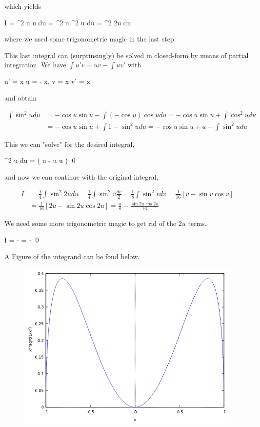 which yields

\bee
I = \int \sin^2 u  \cos u du = \int \sin^2 u \cos^2 u du =  \int \sin^2 2u du
\eee

where we used some trigonometric magic in the last step.

This last integral can (surprinsingly) be solved in closed-form by means of partial integration. We have $\int u' v = uv - \int u v'$ with

\bee
u' = \sin x \rightarrow u = - \cos x, v = \sin x \rightarrow v' = \cos x
\eee

and obtain

\begin{align*}
\int \sin^2 u du &= - \cos u \sin u - \int (- \cos u) \cos u du = - \cos u \sin u + \int \cos^2 u du \\ &= - \cos u \sin u + \int 1 - \sin^2 u du = - \cos u \sin u + u - \int \sin^2 u du
\end{align*}

This we can "solve" for the desired integral,

\bee
\int \sin^2 u du =  \left( u - \sin u \cos u \right) \qed
\eee

and now we can continue with the original integral,

\begin{align*}
I &= \frac{1}{4} \int \sin^2 2u du = \frac{1}{4} \int \sin^2 v \frac{dv}{2} = \frac{1}{8} \int \sin^2 v dv = \frac{1}{16} \left[ v - \sin v \cos v \right] \\ &= \frac{1}{16} \left[ 2u - \sin 2u \cos 2u \right] = \frac{u}{8} - \frac{\sin 2u \cos 2u}{16}
\end{align*}

We need some more trigonometric magic to get rid of the $2u$ terms,

\bee
I =  -  =  -  \qed
\eee

A Figure of the integrand can be foud below.

\begin{figure}[hbt!]
\centering
\includegraphics[scale=0.5]{images/interesting_integrals_08_2.png}
\end{figure}



